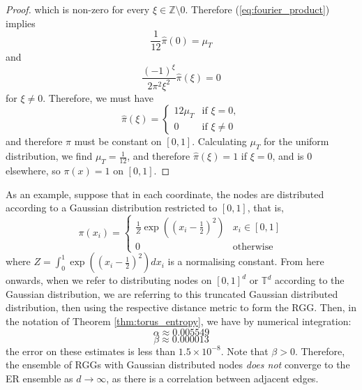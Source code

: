 \documentclass{article}
\newcommand{\tti}{\rightarrow\infty}
\begin{document}
\begin{proof}
    which is non-zero for every $\xi  \in \mathbb{Z}\setminus{0}$. Therefore (\ref{eq:fourier_product}) implies
    \begin{equation}
        \frac{1}{12}\hat{\pi}(0) = \mu_T
    \end{equation}
    and
    \begin{equation}
        \frac{(-1)^{\xi }}{2\pi^2\xi ^2}  \hat{\pi}(\xi ) = 0
    \end{equation}
    for $\xi \neq 0$. Therefore, we must have
    \begin{equation}
        \hat{\pi}(\xi)  = \begin{cases}
            12\mu_T & \text{if }\xi =0, \\
            0 & \text{if }\xi \neq0
        \end{cases}
    \end{equation}
    and therefore $\pi$ must be constant on $[0,1]$. Calculating $\mu_T$ for the uniform distribution, we find $\mu_T = \frac{1}{12}$, and therefore $\hat{\pi}(\xi) = 1$ if $\xi = 0$, and is $0$ elsewhere, so $\pi(x) = 1$ on $[0,1]$.
\end{proof}

As an example, suppose that in each coordinate, the nodes are distributed according to a Gaussian distribution restricted to $[0,1]$, that is,
\begin{equation}
    \label{eq:truncated_gaussian}
    \pi(x_i) = \begin{cases}
        \frac{1}{Z}\exp\left((x_i-\frac{1}{2})^2\right) & x_i \in [0,1] \\
        0 & \text{otherwise}
    \end{cases}
\end{equation}
where $Z = \int_0^1 \exp((x_i-\frac{1}{2})^2) dx_i$ is a normalising constant. From here onwards, when we refer to distributing nodes on $[0,1]^d$ or $\mathbb{T}^d$ according to the Gaussian distribution, we are referring to this truncated Gaussian distributed distribution, then using the respective distance metric to form the RGG.  Then, in the notation of Theorem \ref{thm:torus_entropy}, we have by numerical integration:
\begin{equation}
    \alpha \approx 0.005549
\end{equation}
\begin{equation}
    \beta \approx 0.000013
\end{equation}
the error on these estimates is less than $1.5\times 10^{-8}$. Note that $\beta > 0$. Therefore, the ensemble of RGGs with Gaussian distributed nodes \textit{does not} converge to the ER ensemble as $d\tti$, as there is a correlation between adjacent edges.
\end{document}

